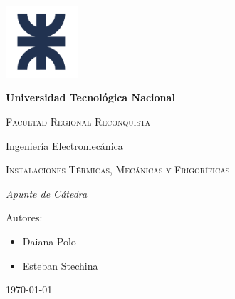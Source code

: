 \begin{titlepage}
	\centering
	{\includegraphics[width=0.2\textwidth]{./recursos/logo}\par}
	\vspace{1cm}
	{\bfseries\LARGE Universidad Tecnológica Nacional \par}
	\vspace{.5cm}
	{\scshape\Large Facultad Regional Reconquista \par}
	\vspace{.5cm}
	{\Large Ingeniería Electromecánica\par}
	\vspace{3cm}
	{\scshape\Huge Instalaciones Térmicas, Mecánicas y Frigoríficas \par}
	\vspace{3cm}
	{\itshape\Large Apunte de Cátedra\par}
	\vfill
	{\Large Autores:}
	{\large \begin{itemize}[label={},left=0em]\centering\setlength{\itemsep}{-5pt}
			\item Daiana Polo
			\item Esteban Stechina
		\end{itemize} \par}
	\vfill
	{\Large \today \par}
\end{titlepage}